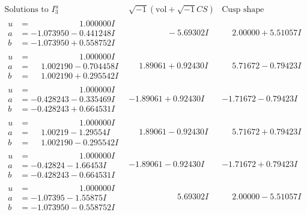 \documentclass[1p]{elsarticle_modified}
\theoremstyle{definition}
\newcommand{\I}{\sqrt{-1}}
\begin{document}
$$\begin{array}{c|c|c}  
\text{Solutions to }I^u_{3}& \I (\text{vol} + \sqrt{-1}CS) & \text{Cusp shape}\\
 \hline 
\begin{aligned}
u &= \phantom{-0.000000 -}1.000000 I \\
a &= -1.073950 - 0.441248 I \\
b &= -1.073950 + 0.558752 I\end{aligned}
 & \phantom{-0.000000 } -5.69302 I & \phantom{-}2.00000 + 5.51057 I \\ \hline\begin{aligned}
u &= \phantom{-0.000000 -}1.000000 I \\
a &= \phantom{-}1.002190 - 0.704458 I \\
b &= \phantom{-}1.002190 + 0.295542 I\end{aligned}
 & \phantom{-}1.89061 + 0.92430 I & \phantom{-}5.71672 - 0.79423 I \\ \hline\begin{aligned}
u &= \phantom{-0.000000 -}1.000000 I \\
a &= -0.428243 - 0.335469 I \\
b &= -0.428243 + 0.664531 I\end{aligned}
 & -1.89061 + 0.92430 I & -1.71672 - 0.79423 I \\ \hline\begin{aligned}
u &= \phantom{-0.000000 -}1.000000 I \\
a &= \phantom{-}1.00219 - 1.29554 I \\
b &= \phantom{-}1.002190 - 0.295542 I\end{aligned}
 & \phantom{-}1.89061 - 0.92430 I & \phantom{-}5.71672 + 0.79423 I \\ \hline\begin{aligned}
u &= \phantom{-0.000000 -}1.000000 I \\
a &= -0.42824 - 1.66453 I \\
b &= -0.428243 - 0.664531 I\end{aligned}
 & -1.89061 - 0.92430 I & -1.71672 + 0.79423 I \\ \hline\begin{aligned}
u &= \phantom{-0.000000 -}1.000000 I \\
a &= -1.07395 - 1.55875 I \\
b &= -1.073950 - 0.558752 I\end{aligned}
 & \phantom{-0.000000 -}5.69302 I & \phantom{-}2.00000 - 5.51057 I \\ \hline\begin{aligned}

\end{aligned}
\end{array}$$
\end{document}
